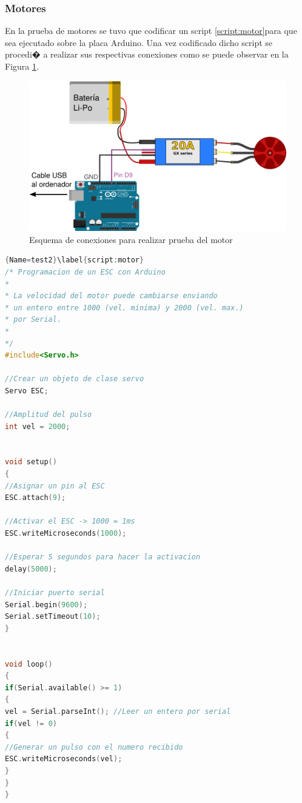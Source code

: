 \subsubsection{Motores}
En la prueba de motores se tuvo que codificar un script  \ref{script:motor}para que sea ejecutado sobre la placa Arduino. Una vez codificado dicho script se procedi� a realizar sus respectivas conexiones como se puede observar en la Figura \ref{fig:testmotor}.

\begin{figure}[h!]
	\centering
	\includegraphics[width=0.7\linewidth, height=0.2\textheight]{Imagenes/testMotor}
	\caption{Esquema de conexiones para realizar prueba del motor}
	\label{fig:testmotor}
\end{figure}



\newpage

\begin{lstlisting}[language=C++]{Name=test2}\label{script:motor}
/* Programacion de un ESC con Arduino
*
* La velocidad del motor puede cambiarse enviando
* un entero entre 1000 (vel. minima) y 2000 (vel. max.)
* por Serial.
*
*/
#include<Servo.h>

//Crear un objeto de clase servo
Servo ESC; 

//Amplitud del pulso
int vel = 2000; 


void setup()
{
//Asignar un pin al ESC
ESC.attach(9);

//Activar el ESC -> 1000 = 1ms
ESC.writeMicroseconds(1000); 

//Esperar 5 segundos para hacer la activacion
delay(5000); 

//Iniciar puerto serial
Serial.begin(9600);
Serial.setTimeout(10);
}


void loop()
{
if(Serial.available() >= 1)
{
vel = Serial.parseInt(); //Leer un entero por serial
if(vel != 0)
{
//Generar un pulso con el numero recibido
ESC.writeMicroseconds(vel); 
}
}
}
\end{lstlisting}
\newpage

